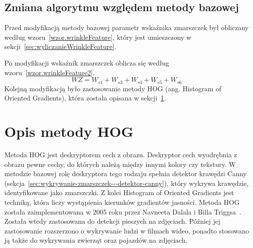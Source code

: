 \documentclass[a4paper,twoside,12pt]{book}
\begin{document}
    \subsection*{Zmiana algorytmu względem metody bazowej}\label{subsec:zmiana-algorytmu-względem-metody-bazowej}
    Przed modyfikacją metody bazowej parametr wskaźnika zmarszczek był obliczany według wzoru~\ref{wzor.wrinkleFeature},
    który jest umieszczony w sekcji~\ref{sec:wyliczanieWrinkleFeature}.

    Po modyfikacji wskaźnik zmarszczek oblicza się według wzoru~\ref{wzor.wrinkleFeature2}.
    \large
    \begin{equation}
        WZ = W_{s1} + W_{s3} + W_{s4} + W_{s5} + W_{s6}
        \label{wzor.wrinkleFeature2}
    \end{equation}
    \normalsize
    Kolejną modyfikacją było zastosowanie metody HOG (ang. Histogram of Oriented Gradients), która została opisana w
    sekcji~\ref{sec:zastosowanie-metody-hog}.

    \section{Opis metody HOG}\label{sec:zastosowanie-metody-hog}
    Metoda HOG jest deskryptorem cech z obrazu.
    Deskryptor cech wyodrębnia z obrazu pewne cechy, do których należą między innymi kolory czy tekstury.
    W metodzie bazowej rolę deskryptora tego rodzaju spełnia detektor
    krawędzi Canny (sekcja~\ref{sec:wykrywanie-zmarszczek---detektor-canny}), który wykrywa krawędzie,
    identyfikowane jako zmarszczki.
    Z kolei Histogram of Oriented Gradients jest techniką, która liczy wystąpienia kierunków gradientów jasności.
    Metoda HOG została zaimplementowana w 2005 roku przez Navneeta Dalala i Billa
    Triggsa~\cite{hogZabojady}.
    Została wtedy zastosowana do detekcji pieszych na zdjęciach.
    Później jej zastosowanie rozszerzono o wykrywanie ludzi w filmach wideo,
    ponadto stosowano ją także do wykrywania zwierząt oraz pojazdów na zdjęciach.
\end{document}
